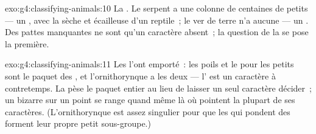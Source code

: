 \begin{solution}{exo:g4:classifying-animals:10}
La . Le serpent a une colonne de centaines de
petits  --- un , avec la  sèche et écailleuse d'un
reptile~; le ver de terre n'a aucune  --- un
. Des pattes manquantes ne sont qu'un caractère absent~;
la question de la  se pose la première.
\end{solution}

\begin{solution}{exo:g4:classifying-animals:11}
Les  l'ont emporté~: les poils et le  pour les petits
sont le paquet des , et l'ornithorynque a les deux ---
l' est un caractère à contretemps. La  pèse le
paquet entier au lieu de laisser un seul caractère décider~; un
 bizarre sur un point se range quand même là où pointent la
plupart de ses caractères. (L'ornithorynque est assez singulier pour
que les  qui pondent des  forment leur propre petit
sous-groupe.)
\end{solution}
